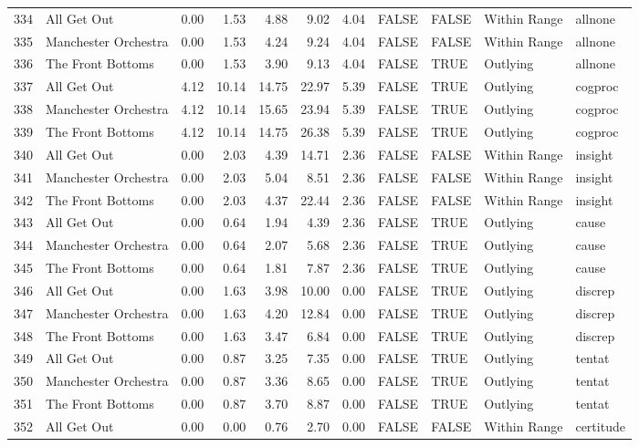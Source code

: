 \begin{table}[ht]
\begin{tabular}{rlrrrrrllll}
  334 & All Get Out & 0.00 & 1.53 & 4.88 & 9.02 & 4.04 & FALSE & FALSE & Within Range & allnone \\ 
  335 & Manchester Orchestra & 0.00 & 1.53 & 4.24 & 9.24 & 4.04 & FALSE & FALSE & Within Range & allnone \\ 
  336 & The Front Bottoms & 0.00 & 1.53 & 3.90 & 9.13 & 4.04 & FALSE & TRUE & Outlying & allnone \\ 
  337 & All Get Out & 4.12 & 10.14 & 14.75 & 22.97 & 5.39 & FALSE & TRUE & Outlying & cogproc \\ 
  338 & Manchester Orchestra & 4.12 & 10.14 & 15.65 & 23.94 & 5.39 & FALSE & TRUE & Outlying & cogproc \\ 
  339 & The Front Bottoms & 4.12 & 10.14 & 14.75 & 26.38 & 5.39 & FALSE & TRUE & Outlying & cogproc \\ 
  340 & All Get Out & 0.00 & 2.03 & 4.39 & 14.71 & 2.36 & FALSE & FALSE & Within Range & insight \\ 
  341 & Manchester Orchestra & 0.00 & 2.03 & 5.04 & 8.51 & 2.36 & FALSE & FALSE & Within Range & insight \\ 
  342 & The Front Bottoms & 0.00 & 2.03 & 4.37 & 22.44 & 2.36 & FALSE & FALSE & Within Range & insight \\ 
  343 & All Get Out & 0.00 & 0.64 & 1.94 & 4.39 & 2.36 & FALSE & TRUE & Outlying & cause \\ 
  344 & Manchester Orchestra & 0.00 & 0.64 & 2.07 & 5.68 & 2.36 & FALSE & TRUE & Outlying & cause \\ 
  345 & The Front Bottoms & 0.00 & 0.64 & 1.81 & 7.87 & 2.36 & FALSE & TRUE & Outlying & cause \\ 
  346 & All Get Out & 0.00 & 1.63 & 3.98 & 10.00 & 0.00 & FALSE & TRUE & Outlying & discrep \\ 
  347 & Manchester Orchestra & 0.00 & 1.63 & 4.20 & 12.84 & 0.00 & FALSE & TRUE & Outlying & discrep \\ 
  348 & The Front Bottoms & 0.00 & 1.63 & 3.47 & 6.84 & 0.00 & FALSE & TRUE & Outlying & discrep \\ 
  349 & All Get Out & 0.00 & 0.87 & 3.25 & 7.35 & 0.00 & FALSE & TRUE & Outlying & tentat \\ 
  350 & Manchester Orchestra & 0.00 & 0.87 & 3.36 & 8.65 & 0.00 & FALSE & TRUE & Outlying & tentat \\ 
  351 & The Front Bottoms & 0.00 & 0.87 & 3.70 & 8.87 & 0.00 & FALSE & TRUE & Outlying & tentat \\ 
  352 & All Get Out & 0.00 & 0.00 & 0.76 & 2.70 & 0.00 & FALSE & FALSE & Within Range & certitude \\ 

\end{tabular}
\end{table}
